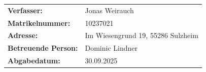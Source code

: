 \documentclass[11pt,a4paper]{article}
\newcommand{\addtoTOC}[1]{\addcontentsline{toc}{section}{#1}}
\begin{document}
\begin{titlepage}
        \begin{flushleft}
            \begin{tabular}{@{}ll}
                \textbf{Verfasser:} & Jonas Weirauch \\
                \textbf{Matrikelnummer:} & 10237021 \\
                \textbf{Adresse:} & Im Wiesengrund 19, 55286 Sulzheim \\
                \textbf{Betreuende Person:} & Dominic Lindner \\
                \textbf{Abgabedatum:} & 30.09.2025 \\
            \end{tabular}
        \end{flushleft}

        \vfill
    \end{titlepage}




\end{document}
